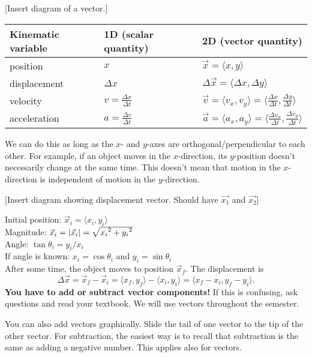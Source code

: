 [Insert diagram of a vector.]

\clearpage
\begin{table}[h]
\begin{tabular}{lll}
\textbf{Kinematic variable} & \textbf{1D (scalar quantity)} & \textbf{2D (vector quantity)}\\
\hline
position & $x$ & $\vec{x}=\langle{x,y}\rangle$\\
displacement & $\Delta{x}$ & $\Delta\vec{x}=\langle{\Delta{x},\Delta{y}}\rangle$\\
velocity & $v=\frac{\Delta{x}}{\Delta{t}}$ & $\vec{v}=\langle{v_x,v_y}\rangle=\langle{\frac{\Delta{x}}{\Delta{t}},\frac{\Delta{y}}{\Delta{t}}}\rangle$\\
acceleration & $a=\frac{\Delta{v}}{\Delta{t}}$ & $\vec{a}=\langle{a_x,a_y}\rangle=\langle{\frac{\Delta{v_x}}{\Delta{t}},\frac{\Delta{v_y}}{\Delta{t}}}\rangle$\\
\hline
\end{tabular}
\end{table}

We can do this as long as the $x$- and $y$-axes are orthogonal/perpendicular to each other. For example, if an object moves in the $x$-direction, its $y$-position doesn't necessarily change at the same time. This doesn't mean that motion in the $x$-direction is independent of motion in the $y$-direction. 

[Insert diagram showing displacement vector. Should have $\vec{x_1}$ and $\vec{x_2}$]
\vspace{6cm}


Initial position: $\vec{x}_i=\langle{x_i,y_i}\rangle$\\
Magnitude: $\vec{x}_i=|\vec{x}_i|=\sqrt{x_i\displaystyle^2+y_i\displaystyle^2}$\\
Angle: $\tan\theta_i=y_i/x_i$\\
If angle is known: $x_i=\cos\theta_i$ and $y_i=\sin\theta_i$\\

After some time, the object moves to position $\vec{x}_f$. The displacement is $$\Delta\vec{x}=\vec{x}_f-\vec{x}_i=\langle{x_f,y_f}\rangle-\langle{x_i,y_i}\rangle=\langle{x_f-x_i,y_f-y_i}\rangle.$$ 
\textbf{You have to add or subtract vector components!} If this is confusing, ask questions and read your textbook. We will use vectors throughout the semester.

You can also add vectors graphically. Slide the tail of one vector to the tip of the other vector. For subtraction, the easiest way is to recall that subtraction is the same as adding a negative number. This applies also for vectors.

